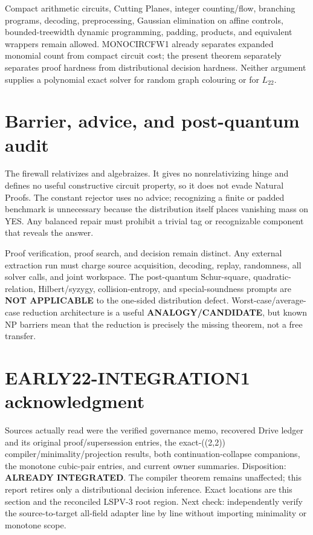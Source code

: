 \documentclass[11pt]{article}
\newcommand{\Ltwo}{L_{22}}
\begin{document}
Compact arithmetic circuits, Cutting Planes, integer counting/flow,
branching programs, decoding, preprocessing, Gaussian elimination on affine
controls, bounded-treewidth dynamic programming, padding, products, and
equivalent wrappers remain allowed.  MONOCIRCFW1 already separates expanded
monomial count from compact circuit cost; the present theorem separately
separates proof hardness from distributional decision hardness.  Neither
argument supplies a polynomial exact solver for random graph colouring or
for \(\Ltwo\).

\section{Barrier, advice, and post-quantum audit}
The firewall relativizes and algebraizes.  It gives no nonrelativizing hinge
and defines no useful constructive circuit property, so it does not evade
Natural Proofs.  The constant rejector uses no advice; recognizing a finite
or padded benchmark is unnecessary because the distribution itself places
vanishing mass on YES.  Any balanced repair must prohibit a trivial tag or
recognizable component that reveals the answer.

Proof verification, proof search, and decision remain distinct.  Any external
extraction run must charge source acquisition, decoding, replay, randomness,
all solver calls, and joint workspace.  The post-quantum Schur-square,
quadratic-relation, Hilbert/syzygy, collision-entropy, and special-soundness
prompts are \textbf{NOT APPLICABLE} to the one-sided distribution defect.
Worst-case/average-case reduction architecture is a useful
\textbf{ANALOGY/CANDIDATE}, but known NP barriers mean that the reduction is
precisely the missing theorem, not a free transfer.

\section{EARLY22-INTEGRATION1 acknowledgment}
Sources actually read were the verified governance memo, recovered Drive
ledger and its original proof/supersession entries, the exact-((2,2))
compiler/minimality/projection results, both continuation-collapse companions,
the monotone cubic-pair entries, and current owner summaries.  Disposition:
\textbf{ALREADY INTEGRATED}.  The compiler theorem remains unaffected; this
report retires only a distributional decision inference.  Exact locations are
this section and the reconciled LSPV-3 root region.  Next check: independently
verify the source-to-target all-field adapter line by line without importing
minimality or monotone scope.
\end{document}
